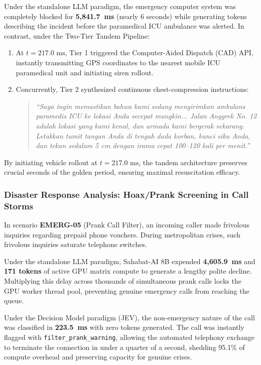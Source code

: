 \documentclass[journal,compsoc]{IEEEtran}
\begin{document}
Under the standalone LLM paradigm, the emergency computer system was completely blocked for \textbf{5,841.7~ms} (nearly 6 seconds) while generating tokens describing the incident before the paramedical ICU ambulance was alerted. In contrast, under the Two-Tier Tandem Pipeline:
\begin{enumerate}
    \item At \textbf{$t = 217.0 \text{ ms}$}, Tier 1 triggered the Computer-Aided Dispatch (CAD) API, instantly transmitting GPS coordinates to the nearest mobile ICU paramedical unit and initiating siren rollout.
    \item Concurrently, Tier 2 synthesized continuous chest-compression instructions:
    \begin{quote}
    \textit{``Saya ingin memastikan bahwa kami sedang mengirimkan ambulans paramedis ICU ke lokasi Anda secepat mungkin... Jalan Anggrek No. 12 adalah lokasi yang kami kenal, dan armada kami bergerak sekarang. Letakkan tumit tangan Anda di tengah dada korban, kunci siku Anda, dan tekan sedalam 5 cm dengan irama cepat 100--120 kali per menit.''}
    \end{quote}
\end{enumerate}
By initiating vehicle rollout at $t = 217.0 \text{ ms}$, the tandem architecture preserves crucial seconds of the golden period, ensuring maximal resuscitation efficacy.

\subsubsection{Disaster Response Analysis: Hoax/Prank Screening in Call Storms}
In scenario \textbf{EMERG-05} (Prank Call Filter), an incoming caller made frivolous inquiries regarding prepaid phone vouchers. During metropolitan crises, such frivolous inquiries saturate telephone switches.

Under the standalone LLM paradigm, Sahabat-AI 8B expended \textbf{4,605.9~ms} and \textbf{171 tokens} of active GPU matrix compute to generate a lengthy polite decline. Multiplying this delay across thousands of simultaneous prank calls locks the GPU worker thread pool, preventing genuine emergency calls from reaching the queue.

Under the Decision Model paradigm (JEV), the non-emergency nature of the call was classified in \textbf{223.5~ms} with zero tokens generated. The call was instantly flagged with \texttt{filter\_prank\_warning}, allowing the automated telephony exchange to terminate the connection in under a quarter of a second, shedding 95.1\% of compute overhead and preserving capacity for genuine crises.
\end{document}
